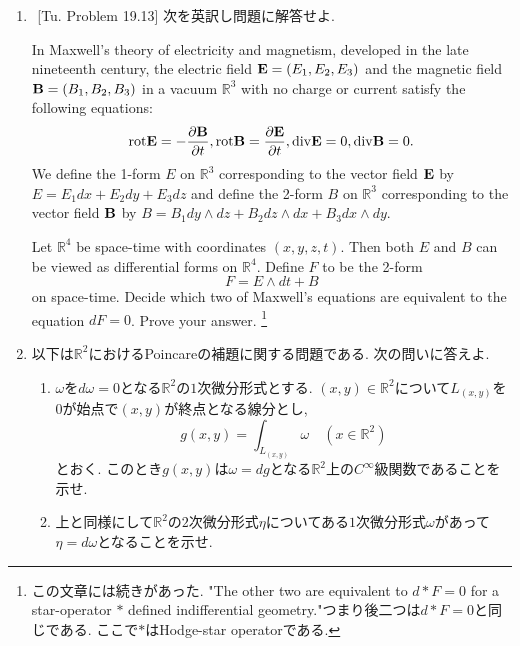 \documentclass[dvipdfmx,a4paper,11pt]{article}
\newcommand{\R}{\mathbb{R}}
\theoremstyle{definition}
\newcommand{\pdrv}[2]{\frac{\partial #1}{\partial #2}}
\begin{document}
\begin{enumerate}[label=\textbf{問}\ref*{sec-Rn-diff-ap}.\arabic*]
\newpage

\item $^{}$ [Tu. Problem 19.13] 次を英訳し問題に解答せよ.

In Maxwell's theory of electricity and magnetism, developed in the late nineteenth century,
the electric field ${\bf E} = (E_1, E_2, E_3)$ and the magnetic field ${\bf B} = (B_1, B_2, B_3)$ in a vacuum
$\R^3$
with no charge or current satisfy the following equations:
$$
{\rm rot}{\bf E} = - \pdrv{{\bf B}}{t} ,  
{\rm rot} {\bf B} = \pdrv{{\bf E}}{t}, 
{\rm div} {\bf E} = 0,
{\rm div} {\bf B} = 0. 
$$
We define the 1-form $E$ on $\R^3$ corresponding to the vector field $ { \bf E}$ by $E = E_1 dx + E_2 dy + E_3 dz$ and define the 2-form $B$ on $\R^3$ corresponding to the vector field ${ \bf B}$ by $B = B_1 dy \wedge dz + B_2 dz \wedge dx + B_3 dx \wedge dy$. 

Let $\R^4$ be space-time with coordinates $(x, y, z, t)$. 
Then both $E$ and $B$ can be viewed as
differential forms on $\R^4$. Define $F$ to be the 2-form
$$
F = E \wedge dt + B
$$
on space-time. Decide which two of Maxwell's equations are equivalent to the equation $dF =0$.
Prove your answer. \footnote{この文章には続きがあった. "The other two are equivalent to $d * F = 0$ for a star-operator $*$ defined indifferential geometry."つまり後二つは$d * F =0$と同じである. ここで$*$はHodge-star operatorである. }

\item \label{poincare} 以下は$\R^2$におけるPoincareの補題に関する問題である. 次の問いに答えよ.
\begin{enumerate}
\setlength{\parskip}{0cm}
  \setlength{\itemsep}{2pt} 
\item $\omega$を$d \omega=0$となる$\R^2$の$1$次微分形式とする.
$(x,y) \in \R^2$について$L_{(x,y)}$を0が始点で$(x,y) $が終点となる線分とし, 
$$g(x,y) = \int_{L_{(x,y) }} \omega \quad (x \in \R^2)$$
とおく. このとき$g(x,y)$は$\omega=dg$となる$\R^2$上の$C^{\infty}$級関数であることを示せ. 
\item 上と同様にして$\R^2$の$2$次微分形式$\eta$についてある$1$次微分形式$\omega$があって$\eta = d \omega$となることを示せ. 
\end{enumerate}

\end{enumerate}
\end{document}
